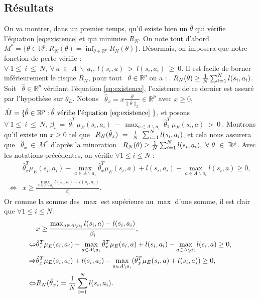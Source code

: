 \documentclass[publibook-draft]{CAp2012}
\begin{document}
\subsection{Résultats}
On va montrer, dans un premier temps, qu'il existe bien un $\hat{\theta}$ qui vérifie l'équation \eqref{eq:existence} et qui minimise $R_N$.
On note tout d'abord ~$M^*=\{\theta\in\mathbb{R}^p:R_N(\theta)=\inf_{\theta \in \mathbb{R}^p}R_N(\theta)\}$. Désormais, on imposera que notre fonction de perte vérifie : ~$\forall~1\leq~i~\leq~N,~\forall~a~\in~A~\backslash~a_i,~l(s_i,a)~>~l(s_i,a_i)~\geq~0$. Il est facile de borner inférieurement le risque $R_N$, pour tout ~$\theta\in\mathbb{R}^p$ on a : ~$R_N(\theta)\geq {1\over N} \sum_{i=1}^N l(s_i,a_i)$. Soit ~$\hat{\theta}\in\mathbb{R}^p$ vérifiant l'équation \eqref{eq:existence}, l'existence de ce dernier est assuré par l'hypothèse sur $\theta_E$. Notons ~$\hat{\theta}_x=x\frac{\hat{\theta}}{\|\hat{\theta}\|_2}\in\mathbb{R}^p$ avec $x\geq0$,~$\hat{M}=\{\hat{\theta}\in\mathbb{R}^p:\hat{\theta} \text{ vérifie l'équation \eqref{eq:existence} }\}$, et posons ~$\forall~1\leq~i~\leq~N,~\beta_i~=~\hat{\theta}_1^T~\mu_E(s_i,a_i)~-~\max_{a\in A \backslash a_i}~\hat{\theta}_1^T~\mu_E(s_i,a)~>~0~$.
Montrons qu'il existe un $x\geq0$ tel que $~R_N(\hat{\theta}_x)~=~{1\over N}~\sum_{i=1}^N l(s_i,a_i)$, et cela nous assurera que ~$\hat{\theta}_x~\in~M^*$ d'après la minoration ~$R_N(\theta)\geq {1\over N} \sum_{i=1}^N l(s_i,a_i),~\forall~\theta~\in~\mathbb{R}^p$. Avec les notations précédentes, on vérifie $\forall 1\leq i \leq N$ :
\begin{align}
&\hat{\theta}_x^T\mu_E(s_i,a_i)-\max_{a\in A \backslash a_i}\hat{\theta}_x^T\mu_E(s_i,a) + l(s_i,a_i)-\max_{a\in A \backslash a_i}l(s_i,a)\geq0,\\
\Leftrightarrow&x\geq\frac{\max_{a\in A \backslash a_i}l(s_i,a)-l(s_i,a_i)}{\beta_i}.
\end{align}
Or comme la somme des $\max$ est supérieure au $\max$ d'une somme, il est clair que $\forall 1\leq i \leq N$:
\begin{align}
&x\geq\frac{\max_{a\in A \backslash a_i}l(s_i,a)-l(s_i,a_i)}{\beta_i},\\
\Leftrightarrow&\hat{\theta}_x^T\mu_E(s_i,a_i)-\max_{a \in A \backslash a_i}\hat{\theta}_x^T\mu_E(s_i,a) + l(s_i,a_i)-\max_{a\in A \backslash a_i}l(s_i,a)\geq0,\\
\Rightarrow&\hat{\theta}_x^T\mu_E(s_i,a_i) + l(s_i,a_i)-\max_{a \in A  \backslash a_i}(\hat{\theta}_x^T\mu_E(s_i,a)+l(s_i,a))\geq0,\\
\Leftrightarrow&R_N(\hat{\theta}_x)={1\over N} \sum_{i=1}^N l(s_i,a_i).
\end{align}
\end{document}
